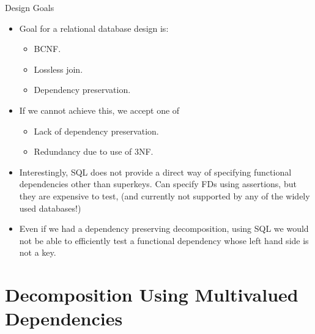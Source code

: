 \documentclass{beamer}
\begin{document}
\begin{frame}{Design Goals}
    \begin{itemize}
        \item Goal for a relational database design is:
            \begin{itemize}
                \item BCNF.
                \item Lossless join.
                \item Dependency preservation.
            \end{itemize}
        \item If we cannot achieve this, we accept one of
            \begin{itemize}
                \item Lack of dependency preservation.
                \item Redundancy due to use of 3NF.
            \end{itemize}
        \item Interestingly, SQL does not provide a direct way of specifying functional dependencies other than superkeys. Can specify FDs using assertions, but they are expensive to test, (and currently not supported by any of the widely used databases!)
        \item Even if we had a dependency preserving decomposition, using SQL we would not be able to efficiently test a functional dependency whose left hand side is not a key.
    \end{itemize}
\end{frame}

\section{Decomposition Using Multivalued Dependencies}
\end{document}
